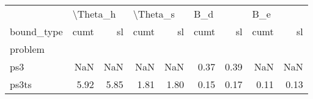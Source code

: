 \begin{tabular}{lrrrrrrrr}
\toprule
{} & \multicolumn{2}{l}{\textbackslash Theta\_h} & \multicolumn{2}{l}{\textbackslash Theta\_s} & \multicolumn{2}{l}{B\_d} & \multicolumn{2}{l}{B\_e} \\
bound\_type &     cumt &   sl &     cumt &   sl & cumt &   sl & cumt &   sl \\
problem &          &      &          &      &      &      &      &      \\
\midrule
ps3     &      NaN &  NaN &      NaN &  NaN & 0.37 & 0.39 &  NaN &  NaN \\
ps3ts   &     5.92 & 5.85 &     1.81 & 1.80 & 0.15 & 0.17 & 0.11 & 0.13 \\
\bottomrule
\end{tabular}
